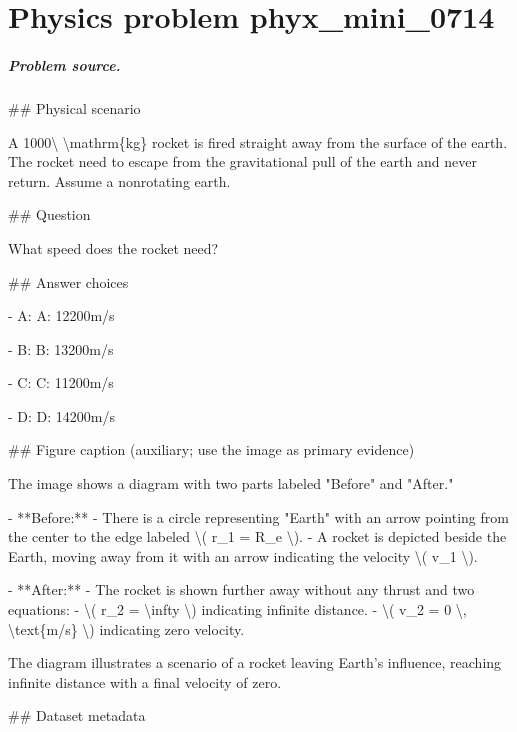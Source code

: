 
\chapter{Physics problem phyx\_mini\_0714}
\label{ch:PhyXMiniProblems_problem_phyx_mini_0714}

\paragraph{Problem source.}
\#\# Physical scenario

A 1000\textbackslash{} \textbackslash{}mathrm\{kg\} rocket is fired straight away from the surface of the earth. The rocket need to escape from the gravitational pull of the earth and never return. Assume a nonrotating earth.

\#\# Question

What speed does the rocket need?

\#\# Answer choices

- A: A: 12200m/s

- B: B: 13200m/s

- C: C: 11200m/s

- D: D: 14200m/s

\#\# Figure caption (auxiliary; use the image as primary evidence)

The image shows a diagram with two parts labeled "Before" and "After."

- **Before:**
  - There is a circle representing "Earth" with an arrow pointing from the center to the edge labeled \textbackslash{}( r\_1 = R\_e \textbackslash{}).
  - A rocket is depicted beside the Earth, moving away from it with an arrow indicating the velocity \textbackslash{}( v\_1 \textbackslash{}).

- **After:**
  - The rocket is shown further away without any thrust and two equations: 
    - \textbackslash{}( r\_2 = \textbackslash{}infty \textbackslash{}) indicating infinite distance.
    - \textbackslash{}( v\_2 = 0 \textbackslash{}, \textbackslash{}text\{m/s\} \textbackslash{}) indicating zero velocity.

The diagram illustrates a scenario of a rocket leaving Earth's influence, reaching infinite distance with a final velocity of zero.

\#\# Dataset metadata

